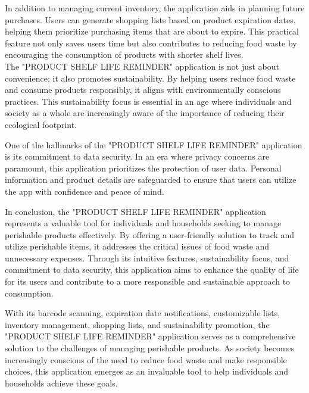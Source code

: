 In addition to managing current inventory, the application aids in planning future purchases. Users can generate shopping lists based on product expiration dates, helping them prioritize purchasing items that are about to expire. This practical feature not only saves users time but also contributes to reducing food waste by encouraging the consumption of products with shorter shelf lives. \\

The "PRODUCT SHELF LIFE REMINDER" application is not just about convenience; it also promotes sustainability. By helping users reduce food waste and consume products responsibly, it aligns with environmentally conscious practices. This sustainability focus is essential in an age where individuals and society as a whole are increasingly aware of the importance of reducing their ecological footprint.

One of the hallmarks of the "PRODUCT SHELF LIFE REMINDER" application is its commitment to data security. In an era where privacy concerns are paramount, this application prioritizes the protection of user data. Personal information and product details are safeguarded to ensure that users can utilize the app with confidence and peace of mind.

In conclusion, the "PRODUCT SHELF LIFE REMINDER" application represents a valuable tool for individuals and households seeking to manage perishable products effectively. By offering a user-friendly solution to track and utilize perishable items, it addresses the critical issues of food waste and unnecessary expenses. Through its intuitive features, sustainability focus, and commitment to data security, this application aims to enhance the quality of life for its users and contribute to a more responsible and sustainable approach to consumption.

With its barcode scanning, expiration date notifications, customizable lists, inventory management, shopping lists, and sustainability promotion, the "PRODUCT SHELF LIFE REMINDER" application serves as a comprehensive solution to the challenges of managing perishable products. As society becomes increasingly conscious of the need to reduce food waste and make responsible choices, this application emerges as an invaluable tool to help individuals and households achieve these goals.
